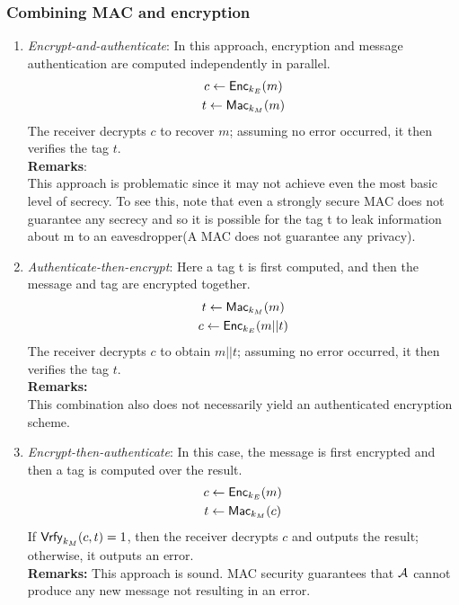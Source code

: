\documentclass[12pt]{article}
\begin{document}
\subsubsection{Combining MAC and encryption}
\begin{enumerate}
\item \emph{Encrypt-and-authenticate}: In this approach, encryption and message authentication are computed independently in parallel. 
    \begin{gather*}
        c \leftarrow \operatorname{\mathsf{Enc}}_{k_E}(m) \\
        t \leftarrow \operatorname{\mathsf{Mac}}_{k_M}(m)
    \end{gather*}
    The receiver decrypts $c$ to recover $m$; assuming no error occurred, it then verifies the tag $t$.\\
\textbf{Remarks}:\\
This approach is problematic since it may not achieve even the most basic level of secrecy. To see this, note that even a strongly secure MAC does not guarantee any secrecy and so it is possible for the tag t to leak information about m to an eavesdropper(A MAC does not guarantee any privacy).
\item \emph{Authenticate-then-encrypt}: Here a tag t is first computed, and then the message and tag are encrypted together. 
    \begin{gather*}
        t \leftarrow \operatorname{\mathsf{Mac}}_{k_M}(m) \\
        c \leftarrow \operatorname{\mathsf{Enc}}_{k_E}(m||t)
    \end{gather*}
    The receiver decrypts $c$ to obtain $m||t$; assuming no error occurred, it then verifies the tag $t$.\\
    \textbf{Remarks:}\\
    This combination also does not necessarily yield an authenticated encryption scheme.
	
\item \emph{Encrypt-then-authenticate}: In this case, the message is first encrypted
and then a tag is computed over the result.
	\begin{gather*}
		c \leftarrow \operatorname{\mathsf{Enc}}_{k_E}(m)\\
		t \leftarrow \operatorname{\mathsf{Mac}}_{k_M}(c) 
	\end{gather*}
	If $\operatorname{\mathsf{Vrfy}}_{k_M}(c,t) = 1$, then the receiver decrypts $c$ and outputs the result; otherwise, it outputs an error.\\
	\textbf{Remarks:} This approach is sound. MAC security guarantees that $\mathcal{A}$ cannot produce any new message not resulting in an error.
\end{enumerate}
\end{document}
